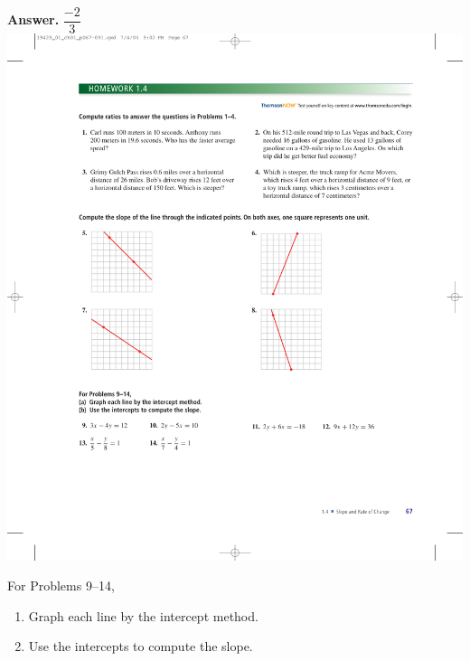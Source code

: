 \documentclass[10pt,]{book}
\theoremstyle{plain}
\theoremstyle{definition}
\theoremstyle{definition}
\theoremstyle{definition}
\theoremstyle{definition}
\numberwithin{equation}{part}
\begin{document}
\begin{exercisegroup}
%
\par\smallskip
\noindent\textbf{Answer.}\hypertarget{answer-129}{}\quad
\(\dfrac{-2}{3}\)%
\exercise[8.]\hypertarget{exercise-223}{}\includegraphics[width=0.6\linewidth]{images/fig-ex-1-4-8}
%
\end{exercisegroup}
\par\smallskip\noindent
\hypertarget{exercisegroup-27}{}\par\noindent For Problems 9–14, \leavevmode%
\begin{enumerate}[label=*\alph**]
\item\hypertarget{li-933}{}Graph each line by the intercept method.%
\item\hypertarget{li-934}{}Use the intercepts to compute the slope.%
\end{enumerate}
%
\end{document}
